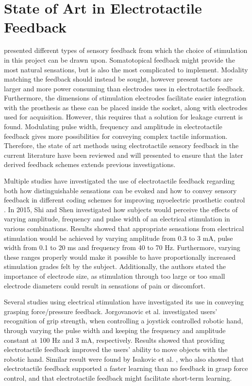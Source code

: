\section{State of Art in Electrotactile Feedback} \label{SoA}

 presented different types of sensory feedback from which the choice of stimulation in this project can be drawn upon. Somatotopical feedback might provide the most natural sensations, but is also the most complicated to implement. Modality matching the feedback should instead be sought, however present tactors are larger and more power consuming than electrodes uses in electrotactile feedback. Furthermore, the dimensions of stimulation electrodes facilitate easier integration with the prosthesis as these can be placed inside the socket, along with electrodes used for acquisition. However, this requires that a solution for leakage current is found. Modulating pulse width, frequency and amplitude in electrotactile feedback gives more possibilities for conveying complex tactile information. Therefore, the state of art methods using electrotactile sensory feedback in the current literature have been reviewed and will presented to ensure that the later derived feedback schemes extends previous investigations. 

Multiple studies have investigated the use of electrotactile feedback regarding both how distinguishable sensations can be evoked and how to convey sensory feedback in different coding schemes for improving myoelectric prosthetic control \cite{Stephens-Fripp2018}. 
In 2015, Shi and Shen \cite{Shi2015} investigated how subjects would perceive the effects of varying amplitude, frequency and pulse width of an electrical stimulation in various combinations. Results showed that appropriate sensations from electrical stimulation would be achieved by varying amplitude from 0.3 to 3 mA, pulse width from 0.1 to 20 ms and frequency from 40 to 70 Hz. Furthermore, varying these ranges properly would make it possible to have proportionally increased stimulation grades felt by the subject. Additionally, the authors stated the importance of electrode size, as stimulation through too large or too small electrode diameters could result in sensations of pain or discomfort. \cite{Shi2015} 
     
Several studies \cite{Pamungkas2015,Xu2016,Jorgovanovic2014,Isakovic2016} using electrical stimulation have investigated its use in conveying grasping force/pressure feedback. Jorgovanovic et al. \cite{Jorgovanovic2014} investigated users' recognition of grip strength, when controlling a joystick controlled robotic hand, through varying the pulse width and keeping the frequency and amplitude constant at 100 Hz and 3 mA, respectively. Results showed that providing electrotactile feedback improved the users' ability to move objects with the robotic hand. \cite{Jorgovanovic2014} Similar result were found by Isakovic et al. \cite{Isakovic2016}, who also showed that electrotactile feedback supported a faster learning than no feedback in grasp force control, and that electrotactile feedback might facilitate short-term learning. 


